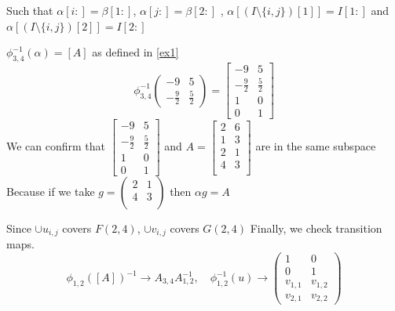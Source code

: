 \documentclass[11pt,a4paper]{report}
\begin{document}
Such that $\alpha [i:] = \beta[1:]$, $\alpha[j:] = \beta[2:]$ , $\alpha[ (I \setminus \{i,j\})[1] ] = I[1:]$ and
$\alpha[ (I \setminus \{i,j \})[2] ] = I[2:]$
\newline
\begin{Ex}
   $ \phi_{3,4}^{-1} (\alpha) = [A] $ as defined in \ref{ex1}
   $$ \phi_{3,4}^{-1}  \begin{pmatrix} -9 & 5 \\ -\frac{9}{2} & \frac{5}{2} \end{pmatrix} = \begin{bmatrix} -9 & 5 \\ -\frac{9}{2} & \frac{5}{2} \\ 1 & 0 \\ 0 & 1 \end{bmatrix} $$ 
   We can confirm that $\begin{bmatrix} -9 & 5 \\ -\frac{9}{2} & \frac{5}{2} \\ 1 & 0 \\ 0 & 1 \end{bmatrix}$ and $A = \begin{bmatrix}
        2 & 6 \\
        1 & 3 \\
        2 & 1 \\
        4 & 3 \\
    \end{bmatrix}$
    are in the same subspace
    Because if we take $g = \begin{pmatrix} 2 & 1 \\ 4 & 3 \\ \end{pmatrix}$
    then $\alpha g = A$
\end{Ex}
Since $\cup u_{i,j}$ covers $F(2,4)$, $\cup v_{i,j}$ covers $G(2,4)$
Finally, we check transition maps.
$$ \phi_{1,2}([A])^{-1} \to A_{3,4} A_{1,2}^{-1}, \quad \phi_{1,2}^{-1}(u) \to
\begin{pmatrix}
1 & 0 \\
0 & 1 \\
v_{1,1} & v_{1,2} \\
v_{2,1} & v_{2,2}
\end{pmatrix}
$$
\end{document}
